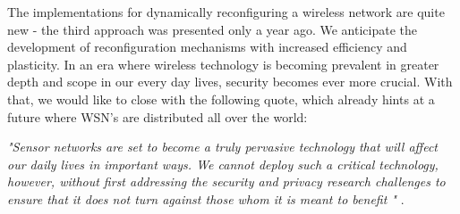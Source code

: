 \documentclass[12pt,a4paper,twoside]{report}
\begin{document}
The implementations for dynamically reconfiguring a wireless network are quite new - the third approach was presented only a year ago. We anticipate the development of reconfiguration mechanisms with increased efficiency and plasticity. In an era where wireless technology is becoming prevalent in greater depth and scope in our every day lives, security becomes ever more crucial. With that, we would like to close with the following quote, which already hints at a future where WSN's are distributed all over the world: \par
\emph{"Sensor networks are set to become a truly pervasive technology that will affect our daily lives in important ways. We cannot deploy such a critical technology, however, without first addressing the security and privacy research challenges to ensure that it does not turn against those whom it is meant to benefit "} \cite{chan;perrig:2003}.\par



\iffalse
\end{document}
